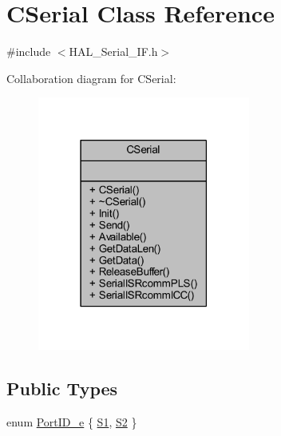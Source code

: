 \hypertarget{class_c_serial}{}\section{C\+Serial Class Reference}
\label{class_c_serial}


{\ttfamily \#include $<$H\+A\+L\+\_\+\+Serial\+\_\+\+I\+F.\+h$>$}



Collaboration diagram for C\+Serial\+:
\nopagebreak
\begin{figure}[H]
\begin{center}
\leavevmode
\includegraphics[width=198pt]{class_c_serial__coll__graph}
\end{center}
\end{figure}
\subsection*{Public Types}
\begin{DoxyCompactItemize}
\item 
enum \mbox{\hyperlink{class_c_serial_a000039540cc90b18bafacf5744e7eda2}{Port\+I\+D\+\_\+e}} \{ \mbox{\hyperlink{class_c_serial_a000039540cc90b18bafacf5744e7eda2a2a245d3c55e5b6e7052daf261924ce08}{S1}}, 
\mbox{\hyperlink{class_c_serial_a000039540cc90b18bafacf5744e7eda2a8cc95f4591147b0df028e003f82220a1}{S2}}
 \}
\end{DoxyCompactItemize}
